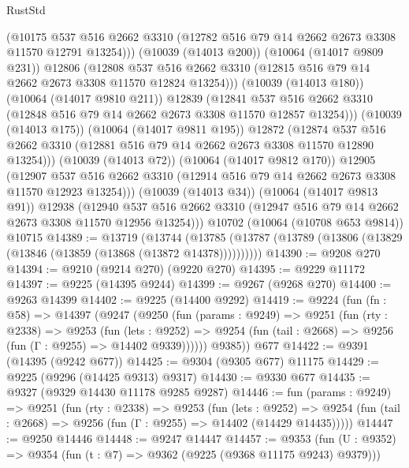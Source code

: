 \begin{lexlean}{RustStd}
\begin{coremodule}
                (@10175
                  @537
                  @516
                  @2662
                  @3310
                  (@12782 @516 @79 @14 @2662 @2673 @3308 @11570 @12791 @13254)))
              (@10039 (@14013 @200))
              (@10064 (@14017 @9809 @231))
              @12806
              (@12808
                @537
                @516
                @2662
                @3310
                (@12815 @516 @79 @14 @2662 @2673 @3308 @11570 @12824 @13254)))
            (@10039 (@14013 @180))
            (@10064 (@14017 @9810 @211))
            @12839
            (@12841
              @537
              @516
              @2662
              @3310
              (@12848 @516 @79 @14 @2662 @2673 @3308 @11570 @12857 @13254)))
          (@10039 (@14013 @175))
          (@10064 (@14017 @9811 @195))
          @12872
          (@12874
            @537
            @516
            @2662
            @3310
            (@12881 @516 @79 @14 @2662 @2673 @3308 @11570 @12890 @13254)))
        (@10039 (@14013 @72))
        (@10064 (@14017 @9812 @170))
        @12905
        (@12907 @537 @516 @2662 @3310 (@12914 @516 @79 @14 @2662 @2673 @3308 @11570 @12923 @13254)))
      (@10039 (@14013 @34))
      (@10064 (@14017 @9813 @91))
      @12938
      (@12940 @537 @516 @2662 @3310 (@12947 @516 @79 @14 @2662 @2673 @3308 @11570 @12956 @13254)))
    @10702
    (@10064 (@10708 @653 @9814))
    @10715
@14389 := @13719
    (@13744 (@13785 (@13787 (@13789 (@13806 (@13829 (@13846 (@13859 (@13868 (@13872 @14378))))))))))
@14390 := @9208 @270
@14394 := @9210 (@9214 @270) (@9220 @270)
@14395 := @9229 @11172
@14397 := @9225 (@14395 @9244)
@14399 := @9267 (@9268 @270)
@14400 := @9263 @14399
@14402 := @9225 (@14400 @9292)
@14419 := @9224
    (fun (fn : @58) =>
    @14397
      (@9247
        (@9250
          (fun (params : @9249) =>
          @9251
            (fun (rty : @2338) =>
            @9253
              (fun (lets : @9252) =>
              @9254 (fun (tail : @2668) => @9256 (fun (Γ : @9255) => @14402 @9339))))))
        @9385))
    @677
@14422 := @9391 (@14395 (@9242 @677))
@14425 := @9304 (@9305 @677) @11175
@14429 := @9225 (@9296 (@14425 @9313) @9317)
@14430 := @9330 @677
@14435 := @9327 (@9329 @14430 @11178 @9285 @9287)
@14446 := fun (params : @9249) =>
  @9251
    (fun (rty : @2338) =>
    @9253
      (fun (lets : @9252) =>
      @9254 (fun (tail : @2668) => @9256 (fun (Γ : @9255) => @14402 (@14429 @14435)))))
@14447 := @9250 @14446
@14448 := @9247 @14447
@14457 := @9353
    (fun (U : @9352) => @9354 (fun (t : @7) => @9362 (@9225 (@9368 @11175 @9243) @9379)))

\end{coremodule}
\end{lexlean}

